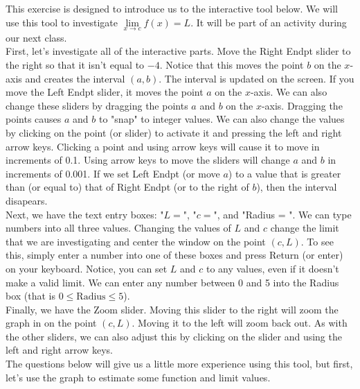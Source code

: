 \documentclass{ximera}
\author{Kevin James}
\begin{document}
   \begin{exercise}
   	This exercise is designed to introduce us to the interactive tool below.  We will use this tool to investigate $ \lim\limits_{x \to c}f(x)=L $.  It will be part of an activity during our next class.  \\
   	   	
   	First, let's investigate all of the interactive parts.  Move the Right Endpt slider to the right so that it isn't equal to $-4$.  Notice that this moves the point $b$ on the $x$-axis and creates the interval $(a,b)$. The interval is updated on the screen.  If you move the Left Endpt slider, it moves the point $a$ on the $x$-axis.  We can also change these sliders by dragging the points $a$ and $b$ on the $x$-axis.  Dragging the points causes $a$ and $b$ to "snap" to integer values.  We can also change the values by clicking on the point (or slider) to activate it and pressing the left and right arrow keys.  Clicking a point and using arrow keys will cause it to move in increments of 0.1.  Using arrow keys to move the sliders will change $a$ and $b$ in increments of 0.001. If we set Left Endpt (or move $a$) to a value that is greater than (or equal to) that of Right Endpt (or to the right of $b$), then the interval disapears.\\
   	
   	Next, we have the text entry boxes: "$L = $", "$c=$", and "Radius = ".  We can type numbers into all three values.  Changing the values of $L$ and $c$ change the limit that we are investigating and center the window on the point $ (c,L) $.  To see this, simply enter a number into one of these boxes and press Return (or enter) on your keyboard.  Notice, you can set $L$ and $c$ to any values, even if it doesn't make a valid limit.  We can enter any number between 0 and 5 into the Radius box (that is $ 0 \leq \text{Radius} \leq 5 $). \\
   	
   	Finally, we have the Zoom slider.  Moving this slider to the right will zoom the graph in on the point $ (c, L) $.  Moving it to the left will zoom back out.  As with the other sliders, we can also adjust this by clicking on the slider and using the left and right arrow keys.\\
   	
   	The questions below will give us a little more experience using this tool, but first, let's use the graph to estimate some function and limit values.
   	
   	\begin{center}
   		\begin{onlineOnly}
   		\end{onlineOnly} 
   	\end{center}
   	

\end{exercise}
\end{document}
